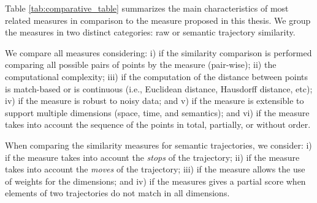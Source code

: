 Table \ref{tab:comparative_table} summarizes the main characteristics of most related measures in comparison to the measure proposed in this thesis. We group the measures in two distinct categories: raw or semantic trajectory similarity.

We compare all measures considering: i) if the similarity comparison is performed comparing all possible pairs of points by the measure (pair-wise); ii) the computational complexity; iii) if the computation of the distance between points is match-based or is continuous (i.e., Euclidean distance, Hausdorff distance, etc); iv) if the measure is robust to noisy data; and v) if the measure is extensible to support multiple dimensions (space, time, and semantics); and vi) if the measure takes into account the sequence of the points in total, partially, or without order.

When comparing the similarity measures for semantic trajectories, we consider: i) if the measure takes into account the \emph{stops} of the trajectory; ii) if the measure takes into account the \emph{moves} of the trajectory; iii) if the measure allows the use of weights for the dimensions; and iv) if the measures gives a partial score when elements of two trajectories do not match in all dimensions.

